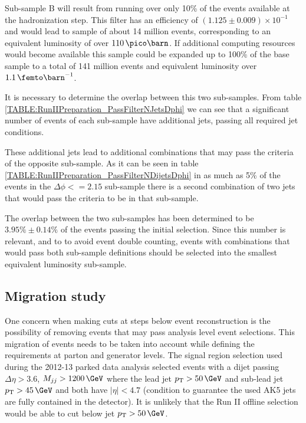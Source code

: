 Sub-sample B will result from running over only 10\% of the events available at the hadronization step. This filter has an efficiency of $(1.125 \pm 0.009) \times 10^{-1}$  and would lead to sample of about 14 million events, corresponding to an equivalent luminosity of over $110\,\pico\barn$. If additional computing resources would become available this sample could be expanded up to 100\% of the base sample to a total of 141 million events and equivalent luminosity over $1.1\,\femto\barn^{-1}$.

It is necessary to determine the overlap between this two sub-samples. From table \ref{TABLE:RunIIPreparation_PassFilterNJetsDphi} we can see that a significant number of events of each sub-sample have additional jets, passing all required jet conditions. 



These additional jets lead to additional combinations that may pass the criteria of the opposite sub-sample. As it can be seen in table \ref{TABLE:RunIIPreparation_PassFilterNDijetsDphi} in as much as 5\% of the events in the $\Delta\phi<=2.15$ sub-sample there is a second combination of two jets that would pass the criteria to be in that sub-sample.



The overlap between the two sub-samples has been determined to be $3.95\% \pm 0.14\%$ of the events passing the initial selection. Since this number is relevant, and to to avoid event double counting, events with combinations that would pass both sub-sample definitions should be selected into the smallest equivalent luminosity sub-sample.

\subsection{Migration study}
\label{SUBSECTION:RunIIPreparation_MigrationStudy}


One concern when making cuts at steps below event reconstruction is the possibility of removing events that may pass analysis level event selections. This migration of events needs to be taken into account while defining the requirements at parton and generator levels. The signal region selection used during the 2012-13 parked data analysis selected events with a dijet passing $\Delta\eta>3.6$, $M_{jj}>1200\,\GeV$ where the lead jet $\pt > 50\,\GeV$ and sub-lead jet $\pt > 45\,\GeV$ and both have $|\eta|<4.7$ (condition to guarantee the used AK5 jets are fully contained in the detector). It is unlikely that the Run II offline selection would be able to cut below jet $\pt > 50\,\GeV$.

